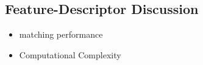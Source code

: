 \subsection{Feature-Descriptor Discussion}

\begin{itemize}
    \item matching performance
    \item Computational Complexity
\end{itemize}
